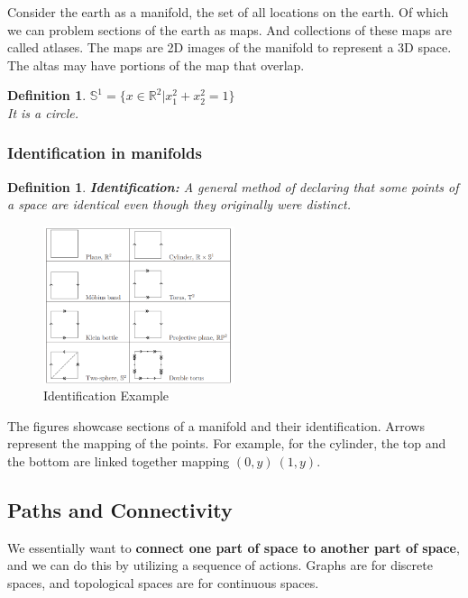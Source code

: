 \documentclass[11pt]{article}
\newtheorem{definition}[theorem]{Definition}
\begin{document}
Consider the earth as a manifold, the set of all locations on the earth. Of which we can problem sections of the earth
as maps. And collections of these maps are called atlases. The maps are 2D images of the manifold to represent a
3D space. The altas may have portions of the map that overlap. 

\begin{definition}
  $\mathbb{S}^1 = \{x \in \mathbb{R}^2 | x_1^2 + x_2^2 = 1\}$ \\ 
  It is a circle.
\end{definition}

\subsubsection{Identification in manifolds}
\begin{definition}
  \textbf{Identification:} A general method of declaring that some points of a space are identical even though they originally were 
  distinct.
\end{definition}

\begin{figure}[h]
  \centering
  \includegraphics[width=0.5\textwidth]{2D_manifolds.png}
  \caption{Identification Example}
\end{figure}

The figures showcase sections of a manifold and their identification.
Arrows represent the mapping of the points. For example, for the cylinder, the top and the bottom are linked together
mapping $(0, y) ~ (1, y)$.

\subsection{Paths and Connectivity}
We essentially want to \textbf{connect one part of space to another part of space}, and we can do this by utilizing a 
sequence of actions. Graphs are for discrete spaces, and topological spaces are for continuous spaces.
\end{document}

